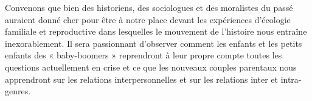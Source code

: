  Convenons que bien des historiens, des sociologues et des moralistes du passé auraient donné cher pour être à notre place devant les expériences d'écologie familiale et reproductive dans lesquelles le mouvement de l'histoire nous entraîne inexorablement. Il sera passionnant d'observer comment les enfants et les petits enfants des « baby-boomers » reprendront à leur propre compte toutes les questions actuellement en crise et ce que les nouveaux couples parentaux nous apprendront sur les relations interpersonnelles et sur les relations inter et intra-genres.
 
 


